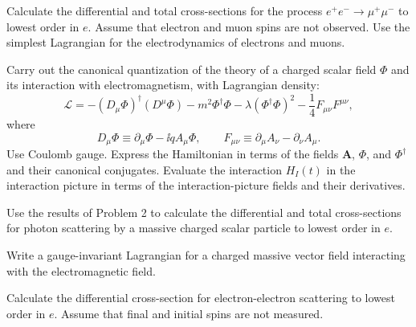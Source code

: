 
\begin{enumerate}
 Calculate the differential and total cross-sections for the process
$e^+e^-\to\mu^+\mu^-$ to lowest order in $e$. Assume that electron and
muon spins are not observed. Use the simplest Lagrangian for the
electrodynamics of electrons and muons.

 Carry out the canonical quantization of the theory of a charged scalar
field $\Phi$ and its interaction with electromagnetism, with Lagrangian
density:
\begin{equation*}
\mathcal{L}=-(D_\mu\Phi)^\dagger(D^\mu\Phi)
-m^2\Phi^\dagger\Phi-\lambda(\Phi^\dagger\Phi)^2
-\frac14 F_{\mu\nu}F^{\mu\nu},
\end{equation*}
where
\begin{equation*}
D_\mu\Phi\equiv\partial_\mu\Phi-\ii qA_\mu\Phi,
\qquad
F_{\mu\nu}\equiv\partial_\mu A_\nu-\partial_\nu A_\mu.
\end{equation*}
Use Coulomb gauge. Express the Hamiltonian in terms of the fields
$\mathbf{A}$, $\Phi$, and $\Phi^\dagger$ and their canonical conjugates.
Evaluate the interaction $H_I(t)$ in the interaction picture in terms of the
interaction-picture fields and their derivatives.

 Use the results of Problem 2 to calculate the differential and total
cross-sections for photon scattering by a massive charged scalar particle to
lowest order in $e$.

 Write a gauge-invariant Lagrangian for a charged massive vector field
interacting with the electromagnetic field.

 Calculate the differential cross-section for electron-electron
scattering to lowest order in $e$. Assume that final and initial spins are not
measured.
\end{enumerate}
